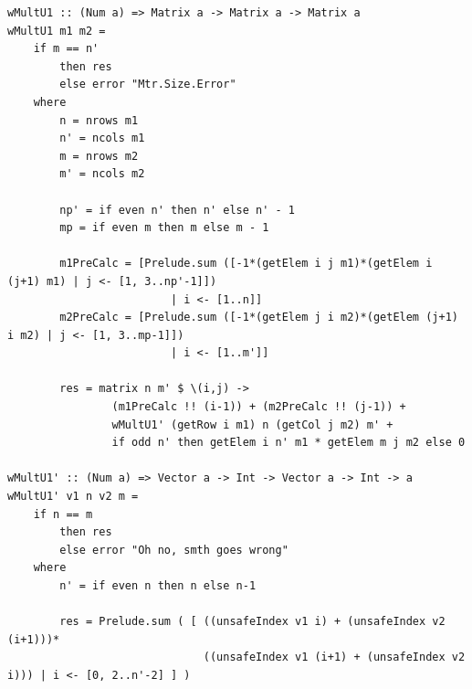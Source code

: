\documentclass[12pt]{report}
\begin{document}
\begin{lstlisting}[label=some-code,caption=Алгоритм Винограда модификация 1]
wMultU1 :: (Num a) => Matrix a -> Matrix a -> Matrix a
wMultU1 m1 m2 = 
    if m == n'
        then res 
        else error "Mtr.Size.Error"
    where
        n = nrows m1
        n' = ncols m1
        m = nrows m2
        m' = ncols m2

        np' = if even n' then n' else n' - 1
        mp = if even m then m else m - 1

        m1PreCalc = [Prelude.sum ([-1*(getElem i j m1)*(getElem i (j+1) m1) | j <- [1, 3..np'-1]])
                         | i <- [1..n]]
        m2PreCalc = [Prelude.sum ([-1*(getElem j i m2)*(getElem (j+1) i m2) | j <- [1, 3..mp-1]])
                         | i <- [1..m']]

        res = matrix n m' $ \(i,j) ->
                (m1PreCalc !! (i-1)) + (m2PreCalc !! (j-1)) +  
                wMultU1' (getRow i m1) n (getCol j m2) m' + 
                if odd n' then getElem i n' m1 * getElem m j m2 else 0

wMultU1' :: (Num a) => Vector a -> Int -> Vector a -> Int -> a
wMultU1' v1 n v2 m = 
    if n == m
        then res
        else error "Oh no, smth goes wrong"
    where
        n' = if even n then n else n-1

        res = Prelude.sum ( [ ((unsafeIndex v1 i) + (unsafeIndex v2 (i+1)))*
                              ((unsafeIndex v1 (i+1) + (unsafeIndex v2 i))) | i <- [0, 2..n'-2] ] )
\end{lstlisting}
\end{document}
